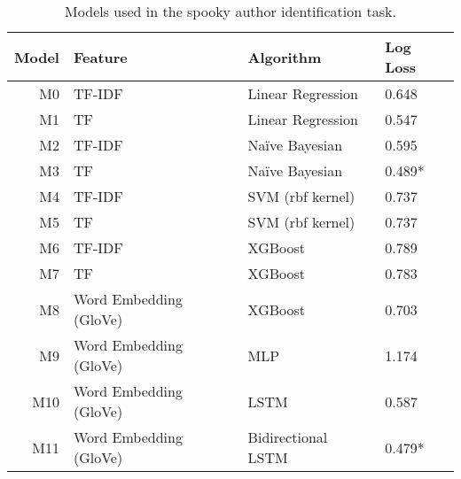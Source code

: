 \documentclass[preprint,journal]{vgtc}       %
\begin{document}
\begin{table}[t]
  \small\sf
  \centering
  \vspace{2mm}
  \begin{tabular}{r|l|l|l}
    \toprule
    Model & Feature & Algorithm & Log Loss \\
    \midrule
    M0  & TF-IDF                 & Linear Regression  & 0.648 \\
    M1  & TF                     & Linear Regression  & 0.547 \\
    M2  & TF-IDF                 & Naïve Bayesian     & 0.595 \\
    M3  & TF                     & Naïve Bayesian     & 0.489* \\
    M4  & TF-IDF                 & SVM (rbf kernel)   & 0.737 \\
    M5  & TF                     & SVM (rbf kernel)   & 0.737 \\
    M6  & TF-IDF                 & XGBoost			  & 0.789 \\
    M7  & TF                     & XGBoost			  & 0.783 \\
    M8  & Word Embedding (GloVe) & XGBoost            & 0.703 \\
    M9  & Word Embedding (GloVe) & MLP                & 1.174 \\
    M10 & Word Embedding (GloVe) & LSTM               & 0.587 \\
    M11 & Word Embedding (GloVe) & Bidirectional LSTM & 0.479* \\
    \bottomrule
  \end{tabular}
  \vspace{1mm}
  \caption{Models used in the spooky author identification task.}
  \label{tab:spooky_model}
  \vspace{-4mm}
\end{table}
\end{document}
